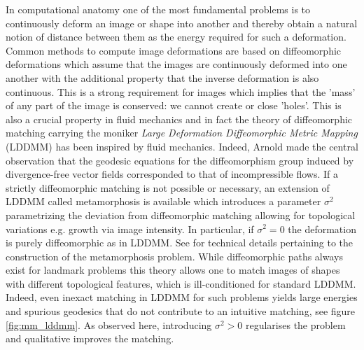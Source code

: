 \documentclass[runningheads]{llncs}
\begin{document}
In computational anatomy
\cite{grenander1994representations,grenander1998computational} one of the most
fundamental problems is to continuously deform an image or shape into another
and thereby obtain a natural notion of distance between them as the energy
required for such a deformation. Common methods to compute image deformations
are based on diffeomorphic deformations which assume that the images are
continuously deformed into one another with the additional property that the
inverse deformation is also continuous.  This is a strong requirement for images
which implies that the 'mass' of any part of the image is conserved: we cannot
create or close 'holes'.  This is also a crucial property in fluid mechanics and
in fact the theory of diffeomorphic matching carrying the moniker \emph{Large
Deformation Diffeomorphic Metric Mapping} (LDDMM)
\cite{trouve1998diffeomorphisms,beg2005computing} has been inspired by fluid
mechanics. Indeed, Arnold \cite{arnold1966geometrie} made the central
observation that the geodesic equations for the diffeomorphism group induced by
divergence-free vector fields corresponded to that of incompressible flows. If a
strictly diffeomorphic matching is not possible or necessary, an extension of
LDDMM called metamorphosis \cite{trouve2005metamorphoses,holm2009euler} is
available which introduces a parameter $\sigma^2$ parametrizing the deviation
from diffeomorphic matching allowing for topological variations e.g. growth via
image intensity. In particular, if $\sigma^2=0$ the deformation is purely
diffeomorphic as in LDDMM.  See
\cite{trouve1995infinite,trouve2005local,miller2001group} for technical details
pertaining to the construction of the metamorphosis problem. While diffeomorphic
paths always exist for landmark problems \cite{guo2006diffeomorphic} this
theory allows one to match images of shapes with different topological features,
which is ill-conditioned for standard LDDMM. Indeed, even inexact matching in
LDDMM for such problems yields large energies and spurious geodesics that do not
contribute to an intuitive matching, see figure \ref{fig:mm_lddmm}. As observed
here, introducing $\sigma^2>0$ regularises the problem and qualitative improves
the matching.\\
\end{document}
